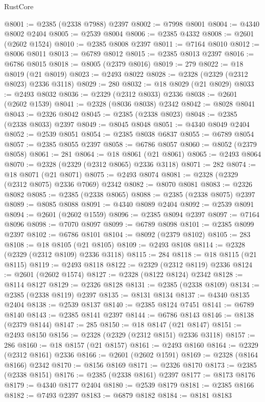 \begin{lexlean}{RustCore}
\begin{coremodule}
@8001 := @2385 (@2338 @7988) @2397
@8002 := @7998 @8001
@8004 := @4340 @8002 @2404
@8005 := @2539 @8004
@8006 := @2385 @4332
@8008 := @2601 (@2602 @1524)
@8010 := @2385 @8008 @2397
@8011 := @7164 @8010
@8012 := @8006 @8011
@8013 := @6789 @8012
@8015 := @2385 @8013 @2397
@8016 := @6786 @8015
@8018 := @8005 (@2379 @8016)
@8019 := 279
@8022 := @18 @8019 (@21 @8019)
@8023 := @2493 @8022
@8028 := @2328 (@2329 (@2312 @8023) @2336 @3118)
@8029 := 280
@8032 := @18 @8029 (@21 @8029)
@8033 := @2493 @8032
@8036 := @2329 (@2312 @8033) @2336
@8038 := @2601 (@2602 @1539)
@8041 := @2328 (@8036 @8038) @2342
@8042 := @8028 @8041
@8043 := @2326 @8042
@8045 := @2385 (@2338 @8023)
@8048 := @2385 (@2338 @8033) @2397
@8049 := @8045 @8048
@8051 := @4340 @8049 @2404
@8052 := @2539 @8051
@8054 := @2385 @8038 @6837
@8055 := @6789 @8054
@8057 := @2385 @8055 @2397
@8058 := @6786 @8057
@8060 := @8052 (@2379 @8058)
@8061 := 281
@8064 := @18 @8061 (@21 @8061)
@8065 := @2493 @8064
@8070 := @2328 (@2329 (@2312 @8065) @2336 @3118)
@8071 := 282
@8074 := @18 @8071 (@21 @8071)
@8075 := @2493 @8074
@8081 := @2328 (@2329 (@2312 @8075) @2336 @7069) @2342
@8082 := @8070 @8081
@8083 := @2326 @8082
@8085 := @2385 (@2338 @8065)
@8088 := @2385 (@2338 @8075) @2397
@8089 := @8085 @8088
@8091 := @4340 @8089 @2404
@8092 := @2539 @8091
@8094 := @2601 (@2602 @1559)
@8096 := @2385 @8094 @2397
@8097 := @7164 @8096
@8098 := @7070 @8097
@8099 := @6789 @8098
@8101 := @2385 @8099 @2397
@8102 := @6786 @8101
@8104 := @8092 (@2379 @8102)
@8105 := 283
@8108 := @18 @8105 (@21 @8105)
@8109 := @2493 @8108
@8114 := @2328 (@2329 (@2312 @8109) @2336 @3118)
@8115 := 284
@8118 := @18 @8115 (@21 @8115)
@8119 := @2493 @8118
@8122 := @2329 (@2312 @8119) @2336
@8124 := @2601 (@2602 @1574)
@8127 := @2328 (@8122 @8124) @2342
@8128 := @8114 @8127
@8129 := @2326 @8128
@8131 := @2385 (@2338 @8109)
@8134 := @2385 (@2338 @8119) @2397
@8135 := @8131 @8134
@8137 := @4340 @8135 @2404
@8138 := @2539 @8137
@8140 := @2385 @8124 @7451
@8141 := @6789 @8140
@8143 := @2385 @8141 @2397
@8144 := @6786 @8143
@8146 := @8138 (@2379 @8144)
@8147 := 285
@8150 := @18 @8147 (@21 @8147)
@8151 := @2493 @8150
@8156 := @2328 (@2329 (@2312 @8151) @2336 @3118)
@8157 := 286
@8160 := @18 @8157 (@21 @8157)
@8161 := @2493 @8160
@8164 := @2329 (@2312 @8161) @2336
@8166 := @2601 (@2602 @1591)
@8169 := @2328 (@8164 @8166) @2342
@8170 := @8156 @8169
@8171 := @2326 @8170
@8173 := @2385 (@2338 @8151)
@8176 := @2385 (@2338 @8161) @2397
@8177 := @8173 @8176
@8179 := @4340 @8177 @2404
@8180 := @2539 @8179
@8181 := @2385 @8166
@8182 := @7493 @2397
@8183 := @6879 @8182
@8184 := @8181 @8183

\end{coremodule}
\end{lexlean}
